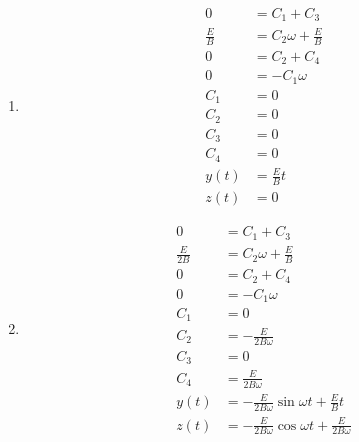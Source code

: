 \documentclass{article}
\begin{document}
\begin{enumerate}
  \item

        \begin{align*}
          0           & = C_1 + C_3                \\
          \frac{E}{B} & = C_2 \omega + \frac{E}{B} \\
          0           & = C_2 + C_4                \\
          0           & = -C_1 \omega              \\
          C_1         & = 0                        \\
          C_2         & = 0                        \\
          C_3         & = 0                        \\
          C_4         & = 0                        \\
          y(t)        & = \frac{E}{B} t            \\
          z(t)        & = 0
        \end{align*}

  \item

        \begin{align*}
          0             & = C_1 + C_3                                                  \\
          \frac{E}{2 B} & = C_2 \omega + \frac{E}{B}                                   \\
          0             & = C_2 + C_4                                                  \\
          0             & = -C_1 \omega                                                \\
          C_1           & = 0                                                          \\
          C_2           & = -\frac{E}{2 B \omega}                                      \\
          C_3           & = 0                                                          \\
          C_4           & = \frac{E}{2 B \omega}                                       \\
          y(t)          & = -\frac{E}{2 B \omega} \sin \omega t + \frac{E}{B} t        \\
          z(t)          & = -\frac{E}{2 B \omega} \cos \omega t + \frac{E}{2 B \omega}
        \end{align*}


\end{enumerate}
\end{document}
